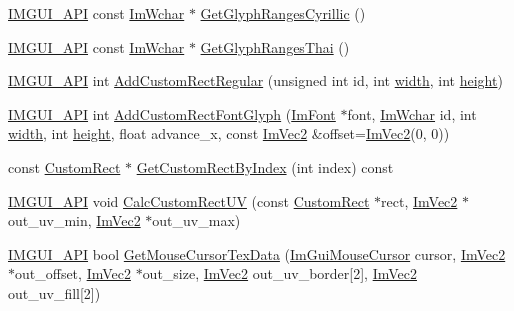 \begin{DoxyCompactItemize}
\item 
\mbox{\hyperlink{imgui_8h_a43829975e84e45d1149597467a14bbf5}{I\+M\+G\+U\+I\+\_\+\+A\+PI}} const \mbox{\hyperlink{imgui_8h_af2c7badaf05a0008e15ef76d40875e97}{Im\+Wchar}} $\ast$ \mbox{\hyperlink{struct_im_font_atlas_a5aaff3357d9ed401ce451c39942e869e}{Get\+Glyph\+Ranges\+Cyrillic}} ()
\item 
\mbox{\hyperlink{imgui_8h_a43829975e84e45d1149597467a14bbf5}{I\+M\+G\+U\+I\+\_\+\+A\+PI}} const \mbox{\hyperlink{imgui_8h_af2c7badaf05a0008e15ef76d40875e97}{Im\+Wchar}} $\ast$ \mbox{\hyperlink{struct_im_font_atlas_a4985c51d8a5270ff027f13fa44a14371}{Get\+Glyph\+Ranges\+Thai}} ()
\item 
\mbox{\hyperlink{imgui_8h_a43829975e84e45d1149597467a14bbf5}{I\+M\+G\+U\+I\+\_\+\+A\+PI}} int \mbox{\hyperlink{struct_im_font_atlas_ac51952803d2205f28ca9fc996c5f6243}{Add\+Custom\+Rect\+Regular}} (unsigned int id, int \mbox{\hyperlink{graphics_8cpp_a2474a5474cbff19523a51eb1de01cda4}{width}}, int \mbox{\hyperlink{graphics_8cpp_ad12fc34ce789bce6c8a05d8a17138534}{height}})
\item 
\mbox{\hyperlink{imgui_8h_a43829975e84e45d1149597467a14bbf5}{I\+M\+G\+U\+I\+\_\+\+A\+PI}} int \mbox{\hyperlink{struct_im_font_atlas_a5643182be4e3f1a442cfa6cdc0321c7c}{Add\+Custom\+Rect\+Font\+Glyph}} (\mbox{\hyperlink{struct_im_font}{Im\+Font}} $\ast$font, \mbox{\hyperlink{imgui_8h_af2c7badaf05a0008e15ef76d40875e97}{Im\+Wchar}} id, int \mbox{\hyperlink{graphics_8cpp_a2474a5474cbff19523a51eb1de01cda4}{width}}, int \mbox{\hyperlink{graphics_8cpp_ad12fc34ce789bce6c8a05d8a17138534}{height}}, float advance\+\_\+x, const \mbox{\hyperlink{struct_im_vec2}{Im\+Vec2}} \&offset=\mbox{\hyperlink{struct_im_vec2}{Im\+Vec2}}(0, 0))
\item 
const \mbox{\hyperlink{struct_im_font_atlas_1_1_custom_rect}{Custom\+Rect}} $\ast$ \mbox{\hyperlink{struct_im_font_atlas_a4d4403e920f1d93307936781050b52ee}{Get\+Custom\+Rect\+By\+Index}} (int index) const
\item 
\mbox{\hyperlink{imgui_8h_a43829975e84e45d1149597467a14bbf5}{I\+M\+G\+U\+I\+\_\+\+A\+PI}} void \mbox{\hyperlink{struct_im_font_atlas_a70e062104b11a213eb3d177151c418e2}{Calc\+Custom\+Rect\+UV}} (const \mbox{\hyperlink{struct_im_font_atlas_1_1_custom_rect}{Custom\+Rect}} $\ast$rect, \mbox{\hyperlink{struct_im_vec2}{Im\+Vec2}} $\ast$out\+\_\+uv\+\_\+min, \mbox{\hyperlink{struct_im_vec2}{Im\+Vec2}} $\ast$out\+\_\+uv\+\_\+max)
\item 
\mbox{\hyperlink{imgui_8h_a43829975e84e45d1149597467a14bbf5}{I\+M\+G\+U\+I\+\_\+\+A\+PI}} bool \mbox{\hyperlink{struct_im_font_atlas_a6d27a36fe034851310dd00d7dc5253c3}{Get\+Mouse\+Cursor\+Tex\+Data}} (\mbox{\hyperlink{imgui_8h_a9223d6c82bb5d12c2eab5f829ca520ef}{Im\+Gui\+Mouse\+Cursor}} cursor, \mbox{\hyperlink{struct_im_vec2}{Im\+Vec2}} $\ast$out\+\_\+offset, \mbox{\hyperlink{struct_im_vec2}{Im\+Vec2}} $\ast$out\+\_\+size, \mbox{\hyperlink{struct_im_vec2}{Im\+Vec2}} out\+\_\+uv\+\_\+border\mbox{[}2\mbox{]}, \mbox{\hyperlink{struct_im_vec2}{Im\+Vec2}} out\+\_\+uv\+\_\+fill\mbox{[}2\mbox{]})
\end{DoxyCompactItemize}
